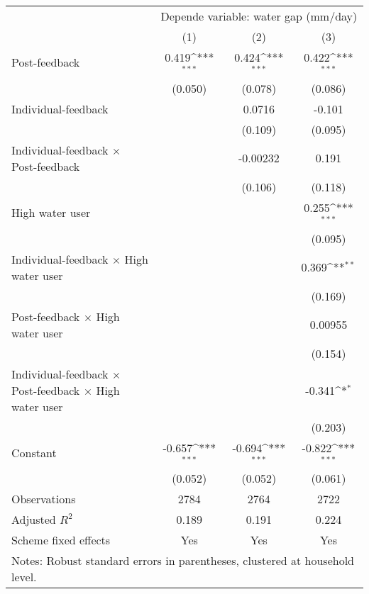{
\def\sym#1{\ifmmode^{#1}\else\(^{#1}\)\fi}
\begin{tabular}{l*{3}{c}}
\hline\hline
                    &\multicolumn{3}{c}{Depende variable: water gap (mm/day)}         \\\cmidrule(lr){2-4}
                    &\multicolumn{1}{c}{(1)}         &\multicolumn{1}{c}{(2)}         &\multicolumn{1}{c}{(3)}         \\
\hline
Post-feedback       &       0.419\sym{***}&       0.424\sym{***}&       0.422\sym{***}\\
                    &     (0.050)         &     (0.078)         &     (0.086)         \\
[1em]
Individual-feedback &                     &      0.0716         &      -0.101         \\
                    &                     &     (0.109)         &     (0.095)         \\
[1em]
Individual-feedback $\times$ Post-feedback&                     &    -0.00232         &       0.191         \\
                    &                     &     (0.106)         &     (0.118)         \\
[1em]
High water user     &                     &                     &       0.255\sym{***}\\
                    &                     &                     &     (0.095)         \\
[1em]
Individual-feedback $\times$ High water user&                     &                     &       0.369\sym{**} \\
                    &                     &                     &     (0.169)         \\
[1em]
Post-feedback $\times$ High water user&                     &                     &     0.00955         \\
                    &                     &                     &     (0.154)         \\
[1em]
Individual-feedback $\times$ Post-feedback $\times$ High water user&                     &                     &      -0.341\sym{*}  \\
                    &                     &                     &     (0.203)         \\
[1em]
Constant            &      -0.657\sym{***}&      -0.694\sym{***}&      -0.822\sym{***}\\
                    &     (0.052)         &     (0.052)         &     (0.061)         \\
\hline
Observations        &        2784         &        2764         &        2722         \\
Adjusted \(R^{2}\)  &       0.189         &       0.191         &       0.224         \\
Scheme fixed effects&         Yes         &         Yes         &         Yes         \\
\hline\hline
\multicolumn{4}{l}{\footnotesize Notes: Robust standard errors in parentheses, clustered at household level.}\\
\end{tabular}
}
